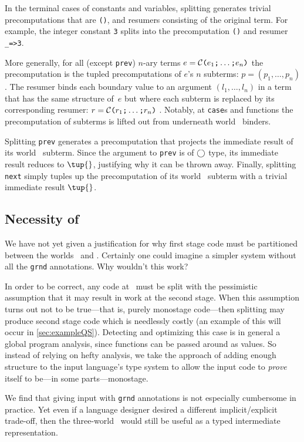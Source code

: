 \begin{abstrsyn}
In the terminal cases of
constants and variables, splitting generates trivial precomputations that are \texttt{()}, and resumers consisting of the original term.
For example, the integer constant \texttt{3} splits into the
precomputation \texttt{()} and resumer \texttt{\_=>3}.

More generally, for all (except \texttt{prev}) 
$n$-ary terms $e = \mathcal{C}\texttt{(} e_1 \texttt{;} \ldots \texttt{;} e_n \texttt{)}$ 
the precomputation is the tupled precomputations of $e$'s $n$ subterms:
$p=(p_1,\ldots,p_n)$.  The resumer binds each boundary value to an
argument $(l_1,\ldots,l_n)$ in a term that has the same structure
of~$e$ but where each subterm is replaced by its corresponding resumer:
$r = \mathcal{C}\texttt{(} r_1 \texttt{;} \ldots \texttt{;} r_n \texttt{)}$ .
Notably, at \texttt{case}s and functions the
precomputation of subterms is lifted out from underneath world \bbtwo\ binders.  

Splitting \texttt{prev} generates a precomputation that projects the immediate
result of its world \bbone\ subterm.
Since the argument to \texttt{prev} is of $\bigcirc$ type, its immediate result reduces to $\tup{}$, justifying why it can be thrown away.
Finally, splitting \texttt{next} simply tuples up the precomputation of its
world \bbtwo\ subterm with a trivial immediate result $\tup{}$.

\subsection {Necessity of \bbonep}
\label{sec:needGround}

We have not yet given a justification for why first stage code must be
partitioned between the worlds \bbonem\ and \bbonep.
Certainly one could imagine a simpler system without all the \texttt{grnd} annotations.  
Why wouldn't this work?

In order to be correct, any code at \bbonem\ must be split with the 
pessimistic assumption that it may result in work at the second stage.
When this assumption turns out not to be true---that is, purely monostage code---then 
splitting may produce second stage code which is needlessly costly 
(an example of this will occur in \ref{sec:exampleQS}).
Detecting and optimizing this case is in general a global program analysis,
since functions can be passed around as values.  
So instead of relying on hefty analysis, 
we take the approach of adding enough structure to the input language's type system to
allow the input code to {\em prove} itself to be---in some parts---monostage.

We find that giving input with \texttt{grnd} annotations is not especially cumbersome in practice.
Yet even if a language designer desired a different implicit/explicit trade-off,
then the three-world \lang\ would still be useful as a typed intermediate representation.

\end{abstrsyn}




